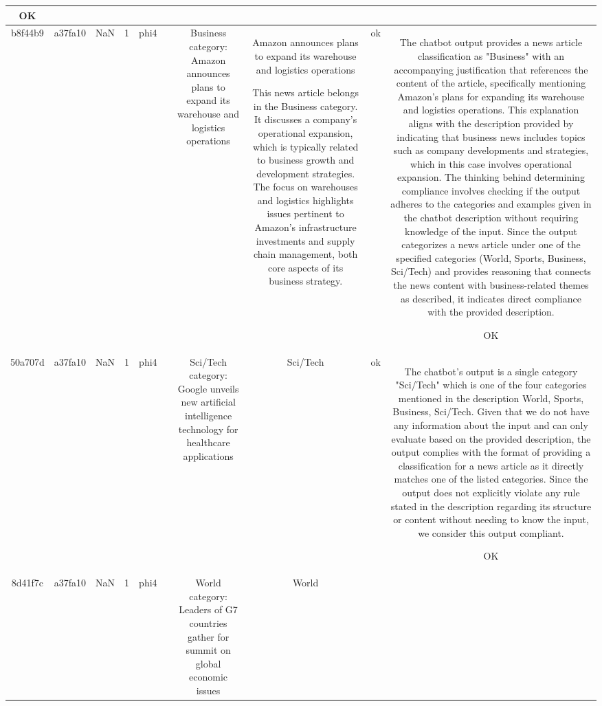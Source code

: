\begin{table}[h!]
\begin{tabular}{|c|c|c|c|c|c|c|c|c|c|}
OK\\
\hline
b8f44b9 & a37fa10 & NaN & 1 & phi4 &  & Business category: Amazon announces plans to expand its warehouse and logistics operations & Amazon announces plans to expand its warehouse and logistics operations

This news article belongs in the Business category. It discusses a company’s operational expansion, which is typically related to business growth and development strategies. The focus on warehouses and logistics highlights issues pertinent to Amazon's infrastructure investments and supply chain management, both core aspects of its business strategy. & ok & The chatbot output provides a news article classification as "Business" with an accompanying justification that references the content of the article, specifically mentioning Amazon's plans for expanding its warehouse and logistics operations. This explanation aligns with the description provided by indicating that business news includes topics such as company developments and strategies, which in this case involves operational expansion. The thinking behind determining compliance involves checking if the output adheres to the categories and examples given in the chatbot description without requiring knowledge of the input. Since the output categorizes a news article under one of the specified categories (World, Sports, Business, Sci/Tech) and provides reasoning that connects the news content with business-related themes as described, it indicates direct compliance with the provided description.

OK\\
\hline
50a707d & a37fa10 & NaN & 1 & phi4 &  & Sci/Tech category: Google unveils new artificial intelligence technology for healthcare applications & Sci/Tech & ok & The chatbot's output is a single category "Sci/Tech" which is one of the four categories mentioned in the description World, Sports, Business, Sci/Tech. Given that we do not have any information about the input and can only evaluate based on the provided description, the output complies with the format of providing a classification for a news article as it directly matches one of the listed categories. Since the output does not explicitly violate any rule stated in the description regarding its structure or content without needing to know the input, we consider this output compliant.

OK\\
\hline
8d41f7c & a37fa10 & NaN & 1 & phi4 &  & World category: Leaders of G7 countries gather for summit on global economic issues & World


\end{tabular}
\end{table}
